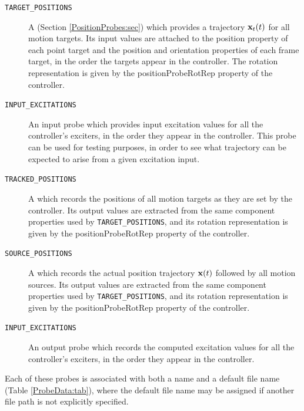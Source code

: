 \begin{description}

\item[{\tt TARGET\_POSITIONS}]\mbox{}

A  (Section \ref{PositionProbes:sec})
which provides a trajectory ${\bf x}_t(t)$ for all motion targets. Its input values
are attached to the {\sf position} property of each point target and the {\sf
position} and {\sf orientation} properties of each frame target, in the order
the targets appear in the controller. The rotation representation is given by
the {\sf positionProbeRotRep} property of the controller.

\item[{\tt INPUT\_EXCITATIONS}]\mbox{}

An input probe which provides input excitation values for all the controller's
exciters, in the order they appear in the controller. This probe can be used
for testing purposes, in order to see what trajectory can be expected to arise
from a given excitation input.

\item[{\tt TRACKED\_POSITIONS}]\mbox{}

A  which records the positions of all
motion targets as they are set by the controller. Its output values are
extracted from the same component properties used by {\tt TARGET\_POSITIONS},
and its rotation representation is given by the {\sf positionProbeRotRep}
property of the controller.

\item[{\tt SOURCE\_POSITIONS}]\mbox{}

A  which records the actual position
trajectory ${\bf x}(t)$ followed by all motion sources. Its output values are
extracted from the same component properties used by {\tt TARGET\_POSITIONS},
and its rotation representation is given by the {\sf positionProbeRotRep}
property of the controller.

\item[{\tt INPUT\_EXCITATIONS}]\mbox{}

An output probe which records the computed excitation values for all the
controller's exciters, in the order they appear in the controller.

\end{description}

Each of these probes is associated with both a name and a default file name
(Table \ref{ProbeData:tab}), where the default file name may be assigned if
another file path is not explicitly specified.


